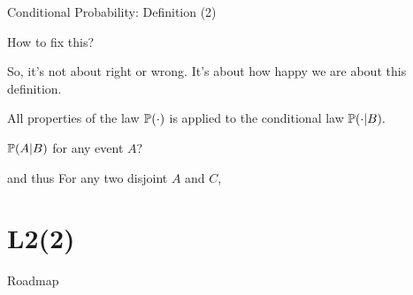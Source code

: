 \begin{frame}{Conditional Probability: Definition (2)}

\plitemsep 0.1in
\bci 

\item<1-> How to fix this?  
\item So, it's not about right or wrong. It's about how happy we are about this definition. 
\eci

\item<4-> All properties of the law $\mathbb{P}( \cdot )$ is applied to the conditional law $\mathbb{P}( \cdot | B ).$ 
\bci
\item<5->  $\mathbb{P}( A | B )$ for any event $A$?
\item<6->  and thus  For any two disjoint  $A$ and $C$,
\eci




\eci 

\end{frame}



\section{L2(2)}
\begin{frame}{Roadmap}

\bce[(1)]
\item {}

\item {}

\item {}

\ece
\end{frame}


